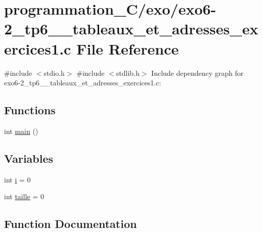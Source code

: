 \hypertarget{exo6-2__tp6__2__tableaux__et__adresses__exercices1_8c}{}\section{programmation\+\_\+\+C/exo/exo6-\/2\+\_\+tp6\+\_\+\_\+tableaux\+\_\+et\+\_\+adresses\+\_\+exercices1.c File Reference}
\label{exo6-2__tp6__2__tableaux__et__adresses__exercices1_8c}
{\ttfamily \#include $<$stdio.\+h$>$}\newline
{\ttfamily \#include $<$stdlib.\+h$>$}\newline
Include dependency graph for exo6-\/2\+\_\+tp6\+\_\+\_\+tableaux\+\_\+et\+\_\+adresses\+\_\+exercices1.c\+:
\subsection*{Functions}
\begin{DoxyCompactItemize}
\item 
int \hyperlink{exo6-2__tp6__2__tableaux__et__adresses__exercices1_8c_ae66f6b31b5ad750f1fe042a706a4e3d4}{main} ()
\end{DoxyCompactItemize}
\subsection*{Variables}
\begin{DoxyCompactItemize}
\item 
int \hyperlink{exo6-2__tp6__2__tableaux__et__adresses__exercices1_8c_acb559820d9ca11295b4500f179ef6392}{i} = 0
\item 
int \hyperlink{exo6-2__tp6__2__tableaux__et__adresses__exercices1_8c_a29bf3fc0ffe4e72e45f0c84ab4f8cd1e}{taille} = 0
\end{DoxyCompactItemize}


\subsection{Function Documentation}
\mbox{\label{exo6-2__tp6__2__tableaux__et__adresses__exercices1_8c_ae66f6b31b5ad750f1fe042a706a4e3d4}} 
